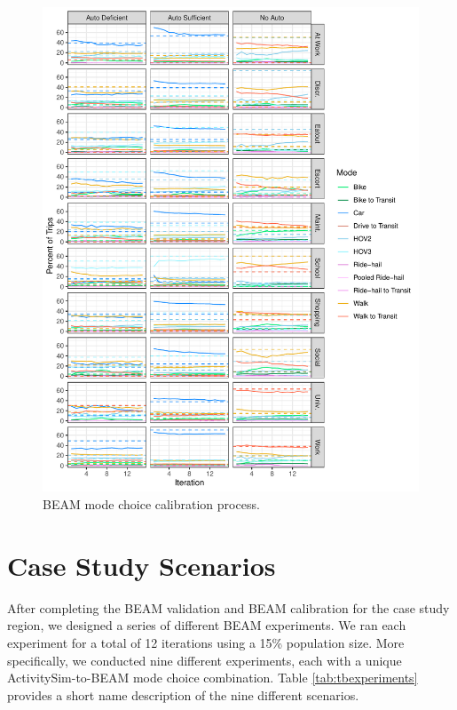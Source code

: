 \documentclass[fancy, masters]{byuthesis}
\begin{document}
\begin{figure}
\centering
\includegraphics{thesis_files/figure-latex/fig-beam-calib-1.pdf}
\caption{\label{fig:fig-beam-calib}BEAM mode choice calibration process.}
\end{figure}

\hypertarget{meth-scenarios}{%
\section{Case Study Scenarios}\label{meth-scenarios}}

After completing the BEAM validation and BEAM calibration for the case study region, we designed a series of different BEAM experiments. We ran each experiment for a total of 12 iterations using a 15\% population size. More specifically, we conducted nine different experiments, each with a unique ActivitySim-to-BEAM mode choice combination. Table \ref{tab:tbexperiments} provides a short name description of the nine different scenarios.
\end{document}
